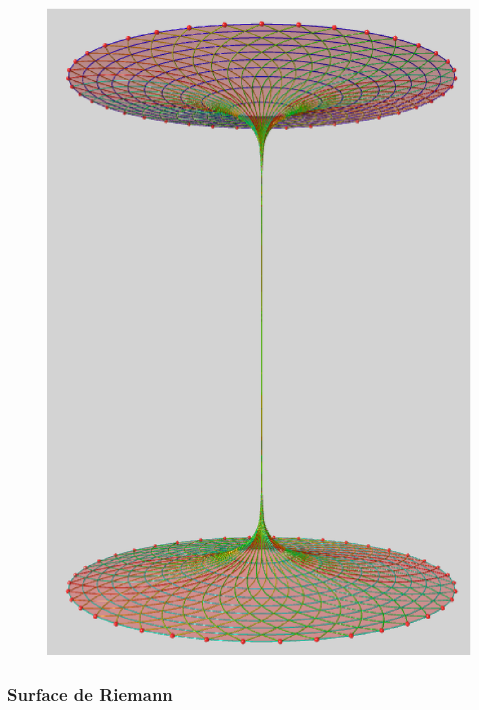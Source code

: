 \documentclass{beamer}
\begin{document}
\begin{frame}
{\begin{figure}[h!]
      \includegraphics[scale=0.25]{9.eps}
\end{figure}
}
\end{frame}

\subsubsection{Surface de Riemann}
\end{document}
